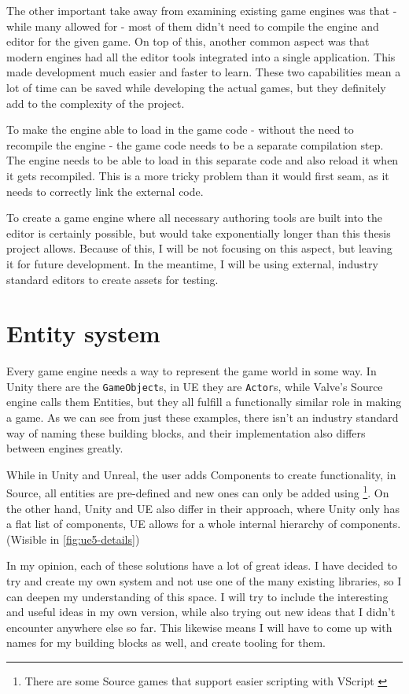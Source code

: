 The other important take away from examining existing game engines was that - while many allowed for - most of them didn't need to compile the engine and editor for the given game. On top of this, another common aspect was that modern engines had all the editor tools integrated into a single application. This made development much easier and faster to learn. These two capabilities mean a lot of time can be saved while developing the actual games, but they definitely add to the complexity of the project.

To make the engine able to load in the game code - without the need to recompile the engine -  the game code needs to be a separate compilation step. The engine needs to be able to load in this separate code and also reload it when it gets recompiled. This is a more tricky problem than it would first seam, as it needs to correctly link the external code.

To create a game engine where all necessary authoring tools are built into the editor is certainly possible, but would take exponentially longer than this thesis project allows. Because of this, I will be not focusing on this aspect, but leaving it for future development. In the meantime, I will be using external, industry standard editors to create assets for testing.


\section{Entity system}

Every game engine needs a way to represent the game world in some way. In Unity there are the \verb|GameObject|s, in UE they are \verb|Actor|s, while Valve's Source engine calls them Entities, but they all fulfill a functionally similar role in making a game. As we can see from just these examples, there isn't an industry standard way of naming these building blocks, and their implementation also differs between engines greatly.

While in Unity and Unreal, the user adds Components to create functionality, in Source, all entities are pre-defined and new ones can only be added using \Cpp \footnote{There are some Source games that support easier scripting with VScript \cite{valve-vscript}}. On the other hand, Unity and UE also differ in their approach, where Unity only has a flat list of components, UE allows for a whole internal hierarchy of components. (Wisible in \autoref{fig:ue5-details})

In my opinion, each of these solutions have a lot of great ideas. I have decided to try and create my own system and not use one of the many existing libraries, so I can deepen my understanding of this space. I will try to include the interesting and useful ideas in my own version, while also trying out new ideas that I didn't encounter anywhere else so far. This likewise means I will have to come up with names for my building blocks as well, and create tooling for them.

